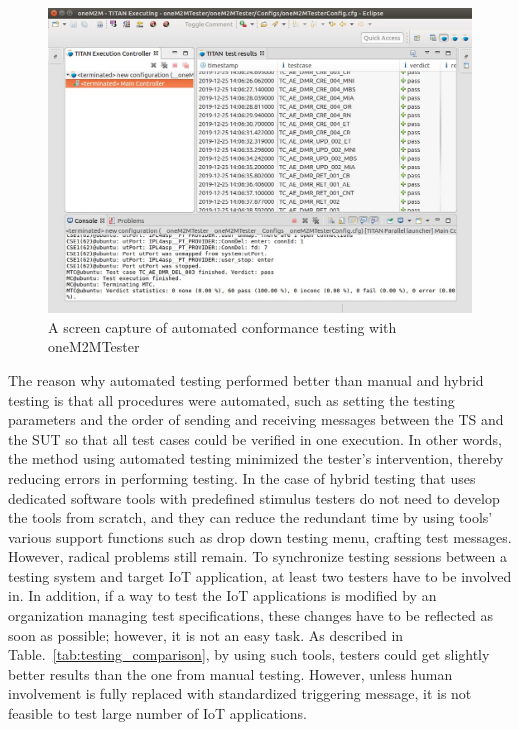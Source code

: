 \begin{figure}[H]			%
	\centering
	\includegraphics[width=\textwidth]{figures/fig_onem2mtester_testing.jpg}
    \caption{A screen capture of automated conformance testing with oneM2MTester}
    \label{fig:screen_capture_onem2mtester}
\end{figure}

The reason why automated testing performed better than manual and hybrid testing is that all procedures were automated, such as setting the testing parameters and the order of sending and receiving messages between the TS and the SUT so that all test cases could be verified in one execution. In other words, the method using automated testing minimized the tester’s intervention, thereby reducing errors in performing testing. In the case of hybrid testing that uses dedicated software tools with predefined stimulus testers do not need to develop the tools from scratch, and they can reduce the redundant time by using tools’ various support functions such as drop down testing menu, crafting test messages. However, radical problems still remain. To synchronize testing sessions between a testing system and target IoT application, at least two testers have to be involved in. In addition, if a way to test the IoT applications is modified by an organization managing test specifications, these changes have to be reflected as soon as possible; however, it is not an easy task. As described in Table.~\ref{tab:testing_comparison}, by using such tools, testers could get slightly better results than the one from manual testing. However, unless human involvement is fully replaced with standardized triggering message, it is not feasible to test large number of IoT applications.

